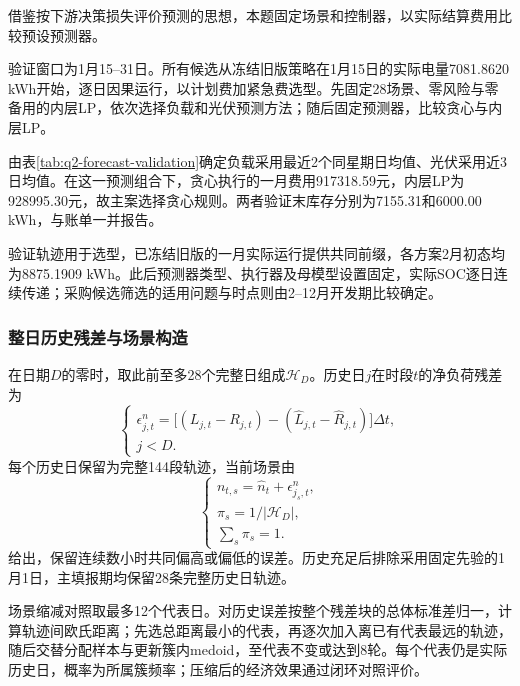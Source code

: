 借鉴按下游决策损失评价预测的思想\cite{elmachtoub2017spo}，本题固定场景和控制器，以实际结算费用比较预设预测器。

验证窗口为1月15--31日。所有候选从冻结旧版策略在1月15日的实际电量7081.8620 kWh开始，逐日因果运行，以计划费加紧急费选型。先固定28场景、零风险与零备用的内层LP，依次选择负载和光伏预测方法；随后固定预测器，比较贪心与内层LP。



由表\ref{tab:q2-forecast-validation}确定负载采用最近2个同星期日均值、光伏采用近3日均值。在这一预测组合下，贪心执行的一月费用917318.59元，内层LP为928995.30元，故主案选择贪心规则。两者验证末库存分别为7155.31和6000.00 kWh，与账单一并报告。

验证轨迹用于选型，已冻结旧版的一月实际运行提供共同前缀，各方案2月初态均为8875.1909 kWh。此后预测器类型、执行器及母模型设置固定，实际SOC逐日连续传递；采购候选筛选的适用问题与时点则由2--12月开发期比较确定。

\subsubsection{整日历史残差与场景构造}

在日期$D$的零时，取此前至多28个完整日组成$\mathcal H_D$。历史日$j$在时段$t$的净负荷残差为
\begin{equation}
 \begin{cases}
 \epsilon^n_{j,t}=
 \big[(L_{j,t}-R_{j,t})-(\widehat L_{j,t}-\widehat R_{j,t})\big]\Delta t,\\
 j<D.
 \end{cases}
 \label{eq:residual}
\end{equation}
每个历史日保留为完整144段轨迹，当前场景由
\begin{equation}
 \begin{cases}
 n_{t,s}=\widehat n_t+\epsilon^n_{j_s,t},\\
 \pi_s=1/|\mathcal H_D|,\\
 \displaystyle\sum_s\pi_s=1.
 \end{cases}
 \label{eq:q2_empirical_scenarios}
\end{equation}
给出，保留连续数小时共同偏高或偏低的误差。历史充足后排除采用固定先验的1月1日，主填报期均保留28条完整历史日轨迹。

场景缩减对照取最多12个代表日。对历史误差按整个残差块的总体标准差归一，计算轨迹间欧氏距离；先选总距离最小的代表，再逐次加入离已有代表最远的轨迹，随后交替分配样本与更新簇内medoid，至代表不变或达到8轮。每个代表仍是实际历史日，概率为所属簇频率；压缩后的经济效果通过闭环对照评价。

